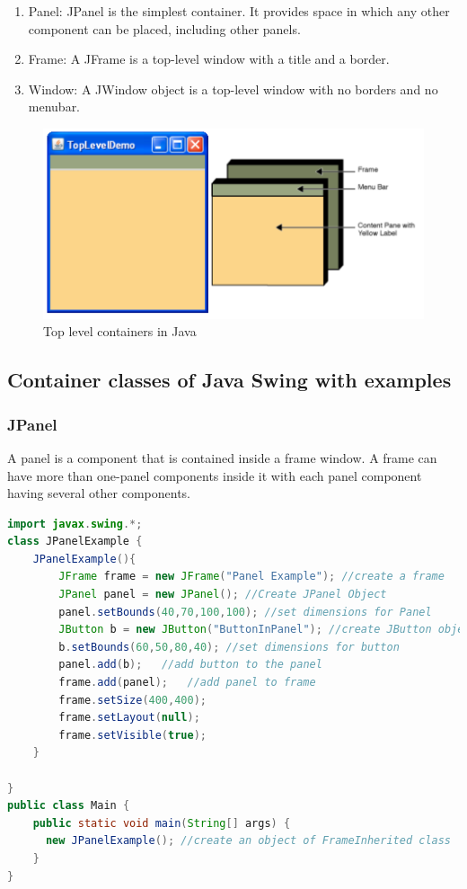\documentclass[11pt]{article}
\begin{document}
\begin{enumerate}
	\item Panel: JPanel is the simplest container. It provides space in which any other component can be placed, including other panels.

	\item Frame: A JFrame is a top-level window with a title and a border.

	\item Window: A JWindow object is a top-level window with no borders and no menubar.
\end{enumerate}
\begin{figure}[H]
	\centering
	\includegraphics[scale=0.5]{containers.png}
	\caption{Top level containers in Java}
\end{figure}
\subsection{Container classes of Java Swing with examples}
\subsubsection{JPanel}
A panel is a component that is contained inside a frame window. A frame can have more than one-panel components inside it with each panel component having several other components.
\begin{lstlisting}[language=Java]
import javax.swing.*;
class JPanelExample {
    JPanelExample(){
        JFrame frame = new JFrame("Panel Example"); //create a frame
        JPanel panel = new JPanel(); //Create JPanel Object
        panel.setBounds(40,70,100,100); //set dimensions for Panel
        JButton b = new JButton("ButtonInPanel"); //create JButton object
        b.setBounds(60,50,80,40); //set dimensions for button
        panel.add(b);   //add button to the panel
        frame.add(panel);   //add panel to frame
        frame.setSize(400,400);
        frame.setLayout(null);
        frame.setVisible(true);
    }
 
}
public class Main {
    public static void main(String[] args) {
      new JPanelExample(); //create an object of FrameInherited class
    }
}
\end{lstlisting}
\end{document}
